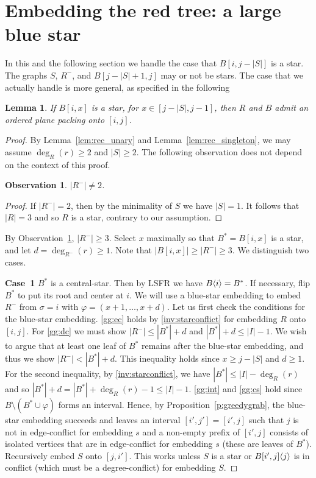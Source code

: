 \documentclass[11pt,a4paper,colorlinks=true,urlcolor=blue,citecolor=red]{article}
\theoremstyle{plain}
\newtheorem{lemma}[theorem]{Lemma}
\newtheorem{observation}[theorem]{Observation}
\newcommand{\case}[1]{\par\vspace{.5\baselineskip}\noindent\textbf{\sffamily Case~#1}}
\begin{document}
\section{Embedding the red tree: a large blue star}
\label{subsec:rec_large_blue_star}
In this and the following section we handle the case that $B[i,j-|S|]$
is a star. The graphs $S$, $R^-$, and $B[j-|S|+1,j]$ may or not be
stars. The case that we actually handle is more general, as specified in
the following
\begin{lemma}\label{lem:rec_large_blue_star}
  If $B[i,x]$ is a star, for $x\in[j-|S|,j-1]$, then $R$ and $B$ admit
  an ordered plane packing onto $[i,j]$.
\end{lemma}
\begin{proof}
  By Lemma~\ref{lem:rec_unary} and Lemma~\ref{lem:rec_singleton}, we may
  assume $\deg_R(r)\geq2$ and $|S|\geq2$. The following observation does
  not depend on the context of this proof.
\begin{observation}\label{obs:rmsize}
    $|R^-|\ne 2$.
  \end{observation}
  \begin{proof}
    If $|R^-|=2$, then by the minimality of $S$ we have $|S|=1$. It
    follows that $|R|=3$ and so $R$ is a star, contrary to our assumption.
  \end{proof}
By Observation~\ref{obs:rmsize}, $|R^-|\ge 3$. Select $x$ maximally so
  that $B^*=B[i,x]$ is a star, and let $d=\deg_{R^-}(r)\ge 1$. Note that
  $|B[i,x]|\geq|R^-|\geq3$. We distinguish two cases.

  \case{1} $B^*$ is a central-star. Then by LSFR we have
  $B\langle{i}\rangle=B^*$. If necessary, flip $B^*$ to put its root and center
  at $i$. We will use a blue-star embedding to embed $R^-$ from
  $\sigma=i$ with $\varphi=(x+1,\dots,x+d)$. Let us first check the
  conditions for the blue-star embedding. \ref{gg:ec} holds by
  \ref{inv:starconflict} for embedding $R$ onto $[i,j]$. For \ref{gg:dc}
  we must show $|R^-|\leq|B^*|+d$ and $|B^*|+d\leq|I|-1$. We wish to
  argue that at least one leaf of $B^*$ remains after the blue-star
  embedding, and thus we show $|R^-|<|B^*|+d$. This inequality holds
  since $x\geq j-|S|$ and $d\geq 1$. For the second inequality, by
  \ref{inv:starconflict}, we have $|B^*|\leq|I|-\deg_R(r)$ and so
  $|B^*|+d=|B^*|+\deg_{R}(r)-1\le|I|-1$. \ref{gg:int} and \ref{gg:cs}
  hold since $B\setminus(B^*\cup\varphi)$ forms an interval. Hence, by
  Proposition~\ref{p:greedygrab}, the blue-star embedding succeeds and
  leaves an interval $[i',j']=[i',j]$ such that $j$ is not in
  edge-conflict for embedding $s$ and a non-empty prefix of $[i',j]$
  consists of isolated vertices that are in edge-conflict for embedding
  $s$ (these are leaves of $B^*$). Recursively embed $S$ onto $[j,i']$.
  This works unless $S$ is a star or $B{[i',j]}\langle{j}\rangle$ is in conflict
  (which must be a degree-conflict) for embedding $S$.



\end{proof}
\end{document}
